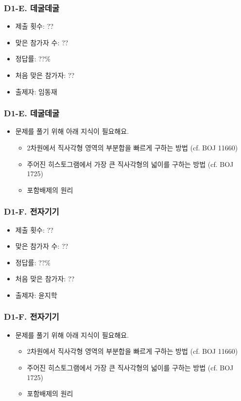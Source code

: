 \documentclass[xetex]{beamer}
\begin{document}
\begin{frame}
  \frametitle{D1-E. 데굴데굴}
  \begin{itemize}
    \item 제출 횟수: ??
    \item 맞은 참가자 수: ??
    \item 정답률: ??\%
    \item 처음 맞은 참가자: ??
    \item 출제자: 임동재
  \end{itemize}
\end{frame}

\begin{frame}
  \frametitle{D1-E. 데굴데굴}
  \begin{itemize}
    \item 문제를 풀기 위해 아래 지식이 필요해요.
    \begin{itemize}
      \item 2차원에서 직사각형 영역의 부분합을 빠르게 구하는 방법 (cf. BOJ 11660)
      \item 주어진 히스토그램에서 가장 큰 직사각형의 넓이를 구하는 방법 (cf. BOJ 1725)
      \item 포함배제의 원리
    \end{itemize}
  \end{itemize}
\end{frame}

\begin{frame}
  \frametitle{D1-F. 전자기기}
  \begin{itemize}
    \item 제출 횟수: ??
    \item 맞은 참가자 수: ??
    \item 정답률: ??\%
    \item 처음 맞은 참가자: ??
    \item 출제자: 윤지학
  \end{itemize}
\end{frame}

\begin{frame}
  \frametitle{D1-F. 전자기기}
  \begin{itemize}
    \item 문제를 풀기 위해 아래 지식이 필요해요.
    \begin{itemize}
      \item 2차원에서 직사각형 영역의 부분합을 빠르게 구하는 방법 (cf. BOJ 11660)
      \item 주어진 히스토그램에서 가장 큰 직사각형의 넓이를 구하는 방법 (cf. BOJ 1725)
      \item 포함배제의 원리
    \end{itemize}
  \end{itemize}
\end{frame}
\end{document}
